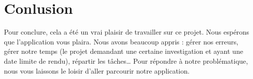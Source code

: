 \documentclass[
]{article}
\begin{document}
\hypertarget{conlusion}{%
\section{Conlusion}\label{conlusion}}

Pour conclure, cela a été un vrai plaisir de travailler sur ce projet.
Nous espérons que l'application vous plaira. Nous avons beaucoup appris
: gérer nos erreurs, gérer notre temps (le projet demandant une certaine
investigation et ayant une date limite de rendu), répartir les
tâches\ldots{} Pour répondre à notre problématique, nous vous laissons
le loisir d'aller parcourir notre application.
\end{document}
